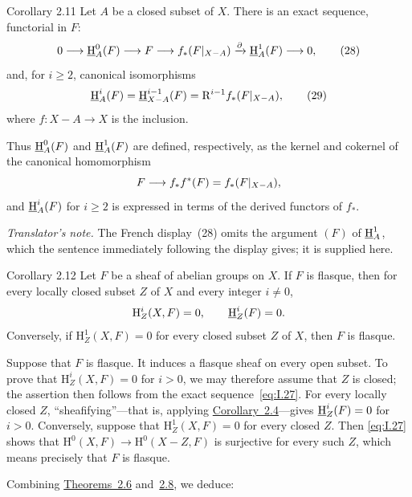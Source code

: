 \begin{sgastatement}{Corollary 2.11}
Let $A$ be a closed subset of $X$. There is an exact sequence, functorial in
$F$:
\begin{equation}
  0\longrightarrow\mathop{\underline{\mathrm H}}\nolimits_A^0(F)
  \longrightarrow F
  \longrightarrow f_*(F\vert_{X-A})
  \xrightarrow{\partial}\mathop{\underline{\mathrm H}}\nolimits_A^1(F)
  \longrightarrow0,
  \tag{28}\label{eq:I.28}
\end{equation}
and, for $i\ge2$, canonical isomorphisms
\begin{equation}
  \mathop{\underline{\mathrm H}}\nolimits_A^i(F)
  =\mathop{\underline{\mathrm H}}\nolimits_{X-A}^{i-1}(F)
  =\mathrm R^{i-1}f_*(F\vert_{X-A}),
  \tag{29}\label{eq:I.29}
\end{equation}
where $f\colon X-A\to X$ is the inclusion.
\end{sgastatement}

Thus $\mathop{\underline{\mathrm H}}\nolimits_A^0(F)$ and $\mathop{\underline{\mathrm H}}\nolimits_A^1(F)$ are defined, respectively, as the kernel
and cokernel of the canonical homomorphism
\[
  F\longrightarrow f_*f^*(F)=f_*(F\vert_{X-A}),
\]
and $\mathop{\underline{\mathrm H}}\nolimits_A^i(F)$ for $i\ge2$ is expressed in terms of the derived functors
of $f_*$.

\noindent\textit{Translator's note.} The French display~(28) omits the argument
$(F)$ of $\mathop{\underline{\mathrm H}}\nolimits_A^1$, which the sentence immediately following the display
gives; it is supplied here.

\begin{sgastatement}{Corollary 2.12}
Let $F$ be a sheaf of abelian groups on $X$. If $F$ is flasque,
then for every locally closed subset $Z$ of $X$ and every integer $i\ne0$,
\[
  \mathrm H_Z^i(X,F)=0,
  \qquad
  \mathop{\underline{\mathrm H}}\nolimits_Z^i(F)=0.
\]
Conversely, if $\mathrm H_Z^1(X,F)=0$ for every closed subset $Z$ of $X$,
then $F$ is flasque.
\end{sgastatement}

Suppose that $F$ is flasque. It induces a flasque sheaf on every open
subset. To prove that $\mathrm H_Z^i(X,F)=0$ for $i>0$, we may therefore
assume that $Z$ is closed; the assertion then follows from the exact
sequence~\eqref{eq:I.27}. For every locally closed $Z$, ``sheafifying''---that
is, applying \hyperref[I.2.4]{Corollary~2.4}---gives $\mathop{\underline{\mathrm H}}\nolimits_Z^i(F)=0$ for $i>0$. Conversely,
suppose that $\mathrm H_Z^1(X,F)=0$ for every closed $Z$. Then
\eqref{eq:I.27} shows that
$\mathrm H^0(X,F)\to\mathrm H^0(X-Z,F)$ is surjective for every such $Z$,
which means precisely that $F$ is flasque.

Combining \hyperref[I.2.6]{Theorems~2.6} and~\hyperref[I.2.8]{2.8}, we deduce:

